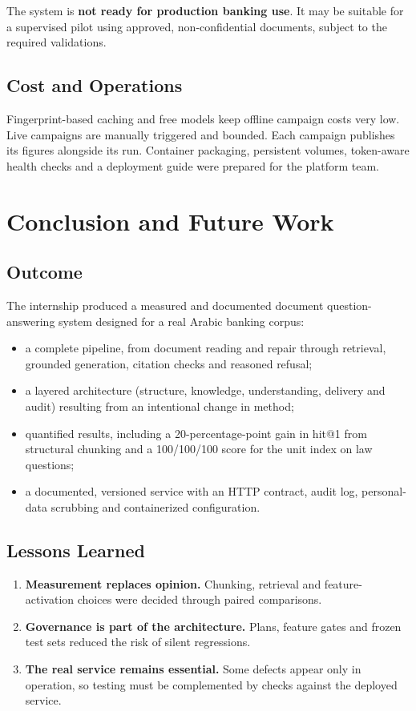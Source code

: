\documentclass[a4paper,12pt,openany]{report}
\begin{document}
The system is \textbf{not ready for production banking use}. It may be suitable for a supervised
pilot using approved, non-confidential documents, subject to the required validations.

\section{Cost and Operations}
Fingerprint-based caching and free models keep offline campaign costs very low. Live campaigns are
manually triggered and bounded. Each campaign publishes its figures alongside its run. Container
packaging, persistent volumes, token-aware health checks and a deployment guide were prepared for
the platform team.

\chapter*{Conclusion and Future Work}

\section*{Outcome}
The internship produced a measured and documented document question-answering system designed for
a real Arabic banking corpus:
\begin{itemize}
  \item a complete pipeline, from document reading and repair through retrieval, grounded
generation, citation checks and reasoned refusal;
  \item a layered architecture (structure, knowledge, understanding, delivery and audit) resulting
from an intentional change in method;
  \item quantified results, including a 20-percentage-point gain in hit@1 from structural chunking
and a 100/100/100 score for the unit index on law questions;
  \item a documented, versioned service with an HTTP contract, audit log, personal-data scrubbing
and containerized configuration.
\end{itemize}

\section*{Lessons Learned}
\begin{enumerate}
  \item \textbf{Measurement replaces opinion.} Chunking, retrieval and feature-activation choices
were decided through paired comparisons.
  \item \textbf{Governance is part of the architecture.} Plans, feature gates and frozen test sets
reduced the risk of silent regressions.
  \item \textbf{The real service remains essential.} Some defects appear only in operation, so
testing must be complemented by checks against the deployed service.
\end{enumerate}
\end{document}
